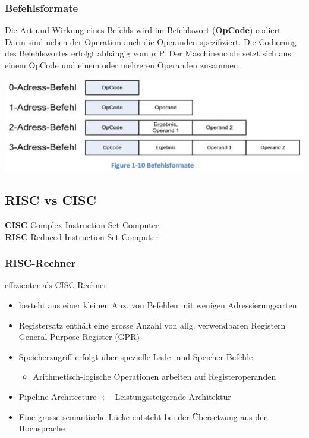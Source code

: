 \subsubsection{Befehlsformate}
\begin{multicols}{2}
\begin{minipage}{\linewidth}
Die Art und Wirkung eines Befehls wird im Befehlswort (\textbf{OpCode}) codiert.
Darin sind neben der Operation auch die Operanden spezifiziert.
Die Codierung des Befehlswortes erfolgt abhängig vom $\mu$ P.
Der Maschinencode setzt sich aus einem OpCode und einem oder mehreren Operanden zusammen.
\end{minipage}

\includegraphics[width=\linewidth]{images/Befehlsformate}
\end{multicols}


\subsection{RISC vs CISC}
\begin{multicols}{2}
    \textbf{CISC}\newline
    Complex Instruction Set Computer
    \\
    \textbf{RISC}\newline
    Reduced Instruction Set Computer
\end{multicols}
\subsubsection{RISC-Rechner}
effizienter als CISC-Rechner
\begin{itemize}
    \item besteht aus einer kleinen Anz. von Befehlen mit wenigen Adressierungsarten
    \item Registersatz enthält eine grosse Anzahl von allg. verwendbaren Registern\newline
    General Purpose Register (GPR)
    \item Speicherzugriff erfolgt über spezielle Lade- und Speicher-Befehle
    \begin{itemize}
        \item Arithmetisch-logische Operationen arbeiten auf Registeroperanden
    \end{itemize}
    \item Pipeline-Architecture $\leftarrow$ Leistungssteigernde Architektur
    \item Eine grosse semantische Lücke entsteht bei der Übersetzung aus der Hochsprache
\end{itemize}

